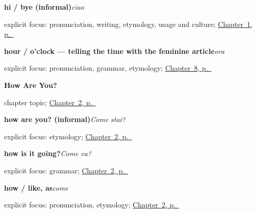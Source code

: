 \noindent\begin{minipage}[t]{\linewidth}
\raggedright
\textbf{hi / bye (informal)}\enspace\emph{ciao}\par
\footnotesize explicit focus: pronunciation, writing, etymology, usage and culture; \hyperref[ch:greetings]{Chapter~1, p.~\pageref*{ch:greetings}}
\end{minipage}\par\smallskip

\noindent\begin{minipage}[t]{\linewidth}
\raggedright
\textbf{hour / o'clock — telling the time with the feminine article}\enspace\emph{ora}\par
\footnotesize explicit focus: pronunciation, grammar, etymology; \hyperref[ch:it-telling-time]{Chapter~8, p.~\pageref*{ch:it-telling-time}}
\end{minipage}\par\smallskip

\noindent\begin{minipage}[t]{\linewidth}
\raggedright
\textbf{How Are You?}\par
\footnotesize chapter topic; \hyperref[ch:it-how-are-you]{Chapter~2, p.~\pageref*{ch:it-how-are-you}}
\end{minipage}\par\smallskip

\noindent\begin{minipage}[t]{\linewidth}
\raggedright
\textbf{how are you? (informal)}\enspace\emph{Come stai?}\par
\footnotesize explicit focus: etymology; \hyperref[ch:it-how-are-you]{Chapter~2, p.~\pageref*{ch:it-how-are-you}}
\end{minipage}\par\smallskip

\noindent\begin{minipage}[t]{\linewidth}
\raggedright
\textbf{how is it going?}\enspace\emph{Come va?}\par
\footnotesize explicit focus: grammar; \hyperref[ch:it-how-are-you]{Chapter~2, p.~\pageref*{ch:it-how-are-you}}
\end{minipage}\par\smallskip

\noindent\begin{minipage}[t]{\linewidth}
\raggedright
\textbf{how / like, as}\enspace\emph{come}\par
\footnotesize explicit focus: pronunciation, etymology; \hyperref[ch:it-how-are-you]{Chapter~2, p.~\pageref*{ch:it-how-are-you}}
\end{minipage}\par\smallskip

